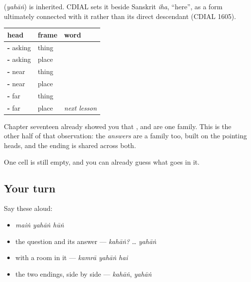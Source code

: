 \begin{cousinweb}
\textbf{} (\emph{yahāṅ}) is inherited. CDIAL sets it beside Sanskrit \emph{iha}, \textquotedblleft{}here\textquotedblright{}, as a form ultimately connected with it rather than its direct descendant (CDIAL 1605).
\end{cousinweb}

\begin{grammarlens}[title={Grammar Lens: the frame, two thirds filled}]
\noindent
\begin{tabularx}{\linewidth}{@{}>{\raggedright\arraybackslash}X>{\raggedright\arraybackslash}X>{\raggedright\arraybackslash}X@{}}
\toprule
\textbf{head} & \textbf{frame} & \textbf{word} \\
\midrule
\textbf{\ur{ک}-} asking & thing & \textbf{\ur{کیا}} \\
\textbf{\ur{ک}-} asking & place & \textbf{\ur{کہاں}} \\
\textbf{\ur{یہ}-} near & thing & \textbf{\ur{یہ}} \\
\textbf{\ur{یہ}-} near & place & \textbf{\ur{یہاں}} \\
\textbf{\ur{وہ}-} far & thing & \textbf{\ur{وہ}} \\
\textbf{\ur{وہ}-} far & place & \emph{next lesson} \\
\bottomrule
\end{tabularx}

Chapter seventeen already showed you that \textbf{}, \textbf{} and \textbf{} are one family. This is the other half of that observation: the \emph{answers} are a family too, built on the pointing heads, and the ending is shared across both.

One cell is still empty, and you can already guess what goes in it.
\end{grammarlens}

\subsection*{Your turn}
Say these aloud:

\begin{itemize}
\raggedright
  \item \emph{maiṅ yahāṅ hūṅ}
  \item the question and its answer — \emph{kahāṅ?} … \emph{yahāṅ}
  \item with a room in it — \emph{kamrā yahāṅ hai}
  \item the two endings, side by side — \emph{kahāṅ}, \emph{yahāṅ}
\end{itemize}


